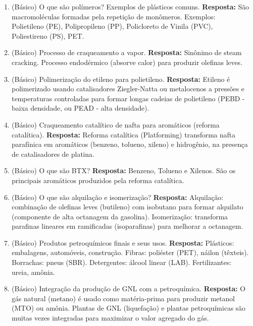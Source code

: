 \documentclass[11pt,a4paper]{article}
\begin{document}
\begin{enumerate}
  \item (Básico) O que são polímeros? Exemplos de plásticos comuns.
  \textbf{Resposta:} São macromoléculas formadas pela repetição de monômeros. Exemplos: Polietileno (PE), Polipropileno (PP), Policloreto de Vinila (PVC), Poliestireno (PS), PET.

  \item (Básico) Processo de craqueamento a vapor.
  \textbf{Resposta:} Sinônimo de steam cracking. Processo endodérmico (absorve calor) para produzir olefinas leves.

  \item (Básico) Polimerização do etileno para polietileno.
  \textbf{Resposta:} Etileno é polimerizado usando catalisadores Ziegler-Natta ou metalocenos a pressões e temperaturas controladas para formar longas cadeias de polietileno (PEBD - baixa densidade, ou PEAD - alta densidade).

  \item (Básico) Craqueamento catalítico de nafta para aromáticos (reforma catalítica).
  \textbf{Resposta:} Reforma catalítica (Platforming) transforma nafta parafínica em aromáticos (benzeno, tolueno, xileno) e hidrogênio, na presença de catalisadores de platina.

  \item (Básico) O que são BTX?
  \textbf{Resposta:} Benzeno, Tolueno e Xilenos. São os principais aromáticos produzidos pela reforma catalítica.

  \item (Básico) O que são alquilação e isomerização?
  \textbf{Resposta:} Alquilação: combinação de olefinas leves (butileno) com isobutano para formar alquilato (componente de alta octanagem da gasolina). Isomerização: transforma parafinas lineares em ramificadas (isoparafinas) para melhorar a octanagem.

  \item (Básico) Produtos petroquímicos finais e seus usos.
  \textbf{Resposta:} Plásticos: embalagens, automóveis, construção. Fibras: poliéster (PET), náilon (têxteis). Borrachas: pneus (SBR). Detergentes: álcool linear (LAB). Fertilizantes: ureia, amônia.

  \item (Básico) Integração da produção de GNL com a petroquímica.
  \textbf{Resposta:} O gás natural (metano) é usado como matéria-prima para produzir metanol (MTO) ou amônia. Plantas de GNL (liquefação) e plantas petroquímicas são muitas vezes integradas para maximizar o valor agregado do gás.


\end{enumerate}
\end{document}
